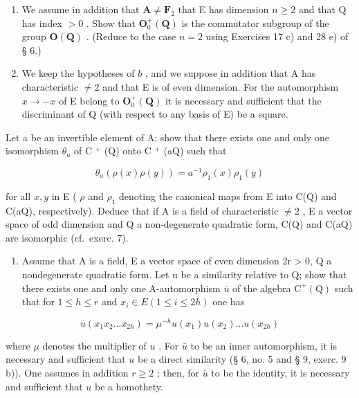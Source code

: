 \begin{enumerate}
\def\labelenumi{\alph{enumi})}
\setcounter{enumi}{1}
\item
  We assume in addition that \(\mathbf{A} \neq \mathbf{F}_2\) that E has dimension \(n \geqslant 2\) and that Q has index \(>0\) . Show that \(\mathbf{O}_0^+(\mathbf{Q})\) is the commutator subgroup of the group \(\mathbf{O}(\mathbf{Q})\) . (Reduce to the case \(n = 2\) using Exercises 17 c) and 28 e) of § 6.)
\item
  We keep the hypotheses of \(b\) , and we suppose in addition that A has characteristic \(\neq 2\) and that E is of even dimension. For the automorphism \(x \to -x\) of E belong to \(\mathbf{O}_0^+(\mathbf{Q})\) it is necessary and sufficient that the discriminant of Q (with respect to any basis of E) be a square.
\end{enumerate}

Let a be an invertible element of A; show that there exists one and only one isomorphism \(\theta_{a}\) of C \(^{+}\) (Q) onto C \(^{+}\) (aQ) such that

\[
\theta_ {a} (\rho (x) \rho (y)) = a ^ {- 1} \rho_ {1} (x) \rho_ {1} (y)
\]

for all \(x, y\) in E ( \(\rho\) and \(\rho_{1}\) denoting the canonical maps from E into C(Q) and C(aQ), respectively). Deduce that if A is a field of characteristic \(\neq 2\) , E a vector space of odd dimension and Q a non-degenerate quadratic form, C(Q) and C(aQ) are isomorphic (cf.~exerc. 7).

\begin{enumerate}
\def\labelenumi{\alph{enumi})}
\setcounter{enumi}{1}
\tightlist
\item
  Assume that A is a field, E a vector space of even dimension 2r \textgreater{} 0, Q a nondegenerate quadratic form. Let u be a similarity relative to Q; show that there exists one and only one A-automorphism \(\overline{u}\) of the algebra \(\mathrm{C}^{+}(\mathrm{Q})\) such that for \(1 \leqslant h \leqslant r\) and \(x_{i} \in E (1 \leqslant i \leqslant 2h)\) one has
\end{enumerate}

\[
\overline {{{u}}} (x _ {1} x _ {2} \dots x _ {2 h}) = \mu^ {- h} u (x _ {1}) u (x _ {2}) \dots u (x _ {2 h})
\]

where \(\mu\) denotes the multiplier of \(u\) . For \(\bar{u}\) to be an inner automorphism, it is necessary and sufficient that \(u\) be a direct similarity (§ 6, no. 5 and § 9, exerc. 9 b)). One assumes in addition \(r \geqslant 2\) ; then, for \(\bar{u}\) to be the identity, it is necessary and sufficient that \(u\) be a homothety.

